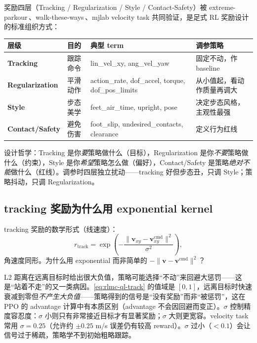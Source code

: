 奖励四层（Tracking / Regularization / Style / Contact-Safety）被 extreme-parkour\,\cite{cheng2024parkour}、walk-these-ways\,\cite{margolis2022walk}、mjlab velocity task 共同验证，是足式 RL 奖励设计的标准组织方式：

\begin{center}
\small
\begin{tabular}{@{}lllp{3.5cm}@{}}
\toprule
层级 & 目的 & 典型 term & 调参策略 \\
\midrule
\textbf{Tracking} & 跟踪命令 & lin\_vel\_xy, ang\_vel\_yaw & 固定不动，作 baseline \\
\textbf{Regularization} & 平滑动作 & action\_rate, dof\_accel, torque, dof\_pos\_limits & 从小值起，看动作质量再调大 \\
\textbf{Style} & 步态美学 & feet\_air\_time, upright, pose & 决定步态风格，主观性最强 \\
\textbf{Contact/Safety} & 避免伤害 & foot\_slip, undesired\_contacts, clearance & 定义行为红线 \\
\bottomrule
\end{tabular}
\end{center}

设计哲学：Tracking 是你\emph{要}策略做什么（目标），Regularization 是你\emph{不要}策略做什么（约束），Style 是你\emph{希望}策略怎么做（偏好），Contact/Safety 是策略\emph{绝对不能}做什么（红线）。调参时四层独立扰动——tracking 好但步态丑，只调 Style；策略抖动，只调 Regularization。

\subsection{tracking 奖励为什么用 exponential kernel}
\label{sec:rlmc-ql-reward-track}

tracking 奖励的数学形式（线速度）：
\begin{equation}
r_{\text{track}} = \exp\!\left(-\frac{\lVert \mathbf{v}_{xy} - \mathbf{v}^{\text{cmd}}_{xy} \rVert^2}{\sigma^2}\right),
\label{eq:rlmc-ql-track}
\end{equation}
角速度同形。为什么用 exponential 而非简单的 $-\lVert \mathbf{v}-\mathbf{v}^{\text{cmd}}\rVert^2$？

\begin{insight}\label{ins:rlmc-ql-expkernel}
L2 距离在远离目标时给出很大负值，策略可能选择“不动”来回避大惩罚——这是“站着不走”的又一类病因。\eqref{eq:rlmc-ql-track} 的值域是 $[0,1]$，远离目标时快速衰减到零但\emph{不产生大负值}——策略得到的信号是“没有奖励”而非“被惩罚”，这在 PPO 的 advantage 计算中有本质区别（advantage 不会因回避而变正）。$\sigma$ 控制精度容忍度：$\sigma$ 小则只有非常接近目标才有显著奖励；$\sigma$ 大则更宽容。velocity task 常用 $\sigma=0.25$（允许约 $\pm 0.25$ m/s 误差仍有较高 reward）。$\sigma$ 过小（$<0.1$）会让信号过于稀疏，策略学不到初始粗略跟踪。
\end{insight}

